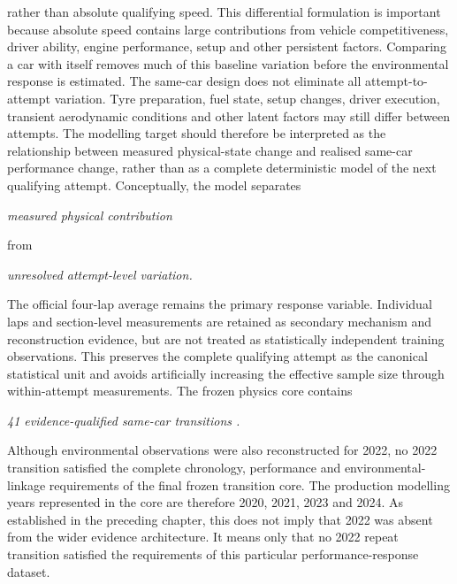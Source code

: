 rather than absolute qualifying speed. This differential formulation is important because absolute speed contains large contributions from vehicle competitiveness, driver ability, engine performance, setup and other persistent factors. Comparing a car with itself removes much of this baseline variation before the environmental response is estimated. The same-car design does not eliminate all attempt-to-attempt variation. Tyre preparation, fuel state, setup changes, driver execution, transient aerodynamic conditions and other latent factors may still differ between attempts. The modelling target should therefore be interpreted as the relationship between measured physical-state change and realised same-car performance change, rather than as a complete deterministic model of the next qualifying attempt. Conceptually, the model separates

\begin{center}\textit{measured physical contribution}\end{center}

from

\begin{center}\textit{unresolved attempt-level variation.}\end{center}

The official four-lap average remains the primary response variable. Individual laps and section-level measurements are retained as secondary mechanism and reconstruction evidence, but are not treated as statistically independent training observations. This preserves the complete qualifying attempt as the canonical statistical unit and avoids artificially increasing the effective sample size through within-attempt measurements. The frozen physics core contains

\begin{center}\textit{41 evidence-qualified same-car transitions .}\end{center}

Although environmental observations were also reconstructed for 2022, no 2022 transition satisfied the complete chronology, performance and environmental-linkage requirements of the final frozen transition core. The production modelling years represented in the core are therefore 2020, 2021, 2023 and 2024. As established in the preceding chapter, this does not imply that 2022 was absent from the wider evidence architecture. It means only that no 2022 repeat transition satisfied the requirements of this particular performance-response dataset.

